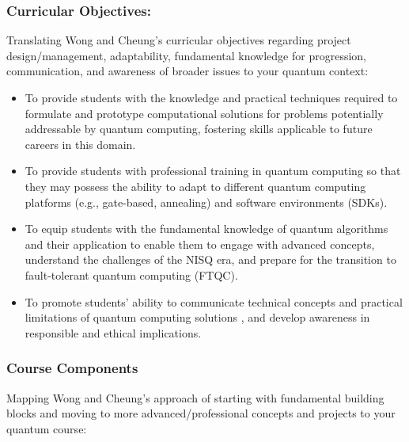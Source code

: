 \documentclass[11pt,a4paper]{article}
\begin{document}
\subsubsection{Curricular Objectives:}

Translating Wong and Cheung's curricular objectives regarding project design/management, adaptability, fundamental knowledge for progression, communication, and awareness of broader issues to your quantum context:

\begin{itemize}	
	
\item To provide students with the knowledge and practical techniques required to formulate and prototype computational solutions
for problems potentially addressable by quantum computing, fostering skills applicable to future careers in this domain.

\item To provide students with professional training in quantum computing so that they may possess the ability to adapt to different quantum computing platforms (e.g., gate-based, annealing)
and software environments (SDKs).

\item To equip students with the fundamental knowledge of quantum algorithms and their application
to enable them to engage with advanced concepts, understand the challenges of the NISQ era, and prepare for the transition to fault-tolerant quantum computing (FTQC).

\item To promote students' ability to communicate technical concepts and practical limitations of quantum computing solutions
, and develop awareness in responsible and ethical implications.

\end{itemize}	

\subsubsection{Course Components}

Mapping Wong and Cheung's approach of starting with fundamental building blocks and moving to more advanced/professional concepts and projects
to your quantum course:
\end{document}
